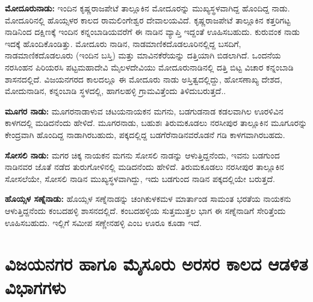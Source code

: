 \textbf{ಮೋದೂರುನಾಡು:} ಇಂದಿನ ಕೃಷ್ಣರಾಜಪೇಟೆ ತಾಲ್ಲೂಕಿನ ಮೋದೂರನ್ನು ಮುಖ್ಯಸ್ಥಳವಾಗಿದ್ದ ಹೊಂದಿದ್ದ ನಾಡು. ಮೋದೂರಿನಲ್ಲಿ ಹೊಯ್ಸಳರ ಕಾಲದ ರಾಮಲಿಂಗೇಶ್ವರ ದೇವಾಲಯವಿದೆ. ಕೃಷ್ಣರಾಜಪೇಟೆ ತಾಲ್ಲೂಕಿನ ಕತ್ತರಿಗಟ್ಟ ನಾಡಿನಿಂದ ದಕ್ಷಿಣಕ್ಕೆ ಇಂದಿನ ಕನ್ನಂಬಾಡಿಯವರೆಗೆ ಈ ನಾಡಿನ ವ್ಯಾಪ್ತಿ ಇದ್ದಂತೆ ಊಹಿಸಬಹುದು. ಕುರುವಂಕ ನಾಡು ಇದಕ್ಕೆ ಹೊಂದಿಕೊಂಡಿತ್ತು. ಮೋದೂರು ನಾಡಿನ, ನಾಡಮಾಣಿಕದೊಡಲೂರಿನಲ್ಲಿದ್ದ ಬಸದಿಗೆ, ನಾಡಮಾಣಿಕದೊಡಲೂರು (ಇಂದಿನ ಬಸ್ತಿ) ಮತ್ತು ಮಾವಿನಕೆರೆಯನ್ನು ದತ್ತಿಯಾಗಿ ಬಿಡಲಾಗಿದೆ. ಒಂದನೆಯ ನರಸಿಂಹನ ಪಿರಿಯರಸಿ ಪಟ್ಟಮಹಾದೇವಿ ಮೈಲಳದೇವಿಯು ಮೋದೂರುನಾಡಿನಲ್ಲಿ ದತ್ತಿ ಬಿಟ್ಟ ವಿಚಾರ ಕನ್ನಂಬಾಡಿ ಶಾಸನದಲ್ಲಿದೆ. ವಿಜಯನಗರದ ಕಾಲದಲ್ಲೂ ಈ ಮೋದೂರು ನಾಡು ಅಸ್ತಿತ್ವದಲ್ಲಿದ್ದು, ಹೋಸಣಾಖ್ಯ ದೇಶದ, ಮೋದುನಾಡಿನ, ಕನ್ನಂಬಾಡಿ ಸ್ಥಳದಲ್ಲಿ, ಹಾಗಲಹಳ್ಳಿ ಗ್ರಾಮವಿತ್ತೆಂದು ತಿಳಿದುಬರುತ್ತದೆ..

\textbf{ಮೂಗರ ನಾಡು:} ಮೂಗರನಾಡಾಳುವ ಚಟಯನಾಯಕನ ಮಗನು, ಬಡಗುಡನಾಡ ಕಡಲವಾಗಿಲ ಊರಳಿವಿನ ಕಾಳಗದಲ್ಲಿ ಮಡಿದನೆಂದು ಹೇಳಿದೆ. ಮೂಗರನಾಡು, ಬಹುಶಃ ತಿರುಮಕೂಡಲು ನರಸೀಪುರ ತಾಲ್ಲೂಕಿನ ಮೂಗೂರನ್ನು ಕೇಂದ್ರವಾಗಿ ಹೊಂದಿದ್ದ ನಾಡಾಗಿರಬಹುದು, ಪಕ್ಕದಲ್ಲಿದ್ದ ಬಡಗೆರೆನಾಡಿನವರೊಡನೆ ಗಡಿ ಕಾಳಗವಾಗಿರಬಹದು.

\textbf{ಸೋಸಲಿ ನಾಡು:} ಮಗರ ಚಿಕ್ಕ ನಾಯಕನ ಮಗನು ಸೋಸಲಿ ನಾಡನ್ನು ಆಳುತ್ತಿದ್ದನೆಂದು, ಇವನು ಬಡಗುಂದ ನಾಡಿನವರ ಜೊತೆ ನಡೆದ ತುರುಗೋಳಿನಲ್ಲಿ ಮಡಿದನೆಂದು ಹೇಳಿದೆ. ತಿರುಮಕೂಡಲು ನರಸೀಪುರ ತಾಲ್ಲೂಕಿನ ಸೋಸಲೆಯೇ, ಸೋಸಲಿ ನಾಡಿನ ಮುಖ್ಯಸ್ಥಳವಾಗಿದ್ದು, ಇದು ಬಡಗುಂದ ನಾಡಿನ ಪಕ್ಕದಲ್ಲಿಯೇ ಬರುತ್ತದೆ.

\textbf{ಹೊಯ್ಸಳ ಸಣ್ನೆನಾಡು:} ಹೊಯ್ಸಳ ಸಣ್ನೆನಾಡನ್ನು ಚಂಗಿಕುಳಕಮಳ ಮಾರ್ತಾಂಡ ಸಾಮಂತ ಭರತೆಯ ನಾಯಕನು ಆಳುತ್ತಿದ್ದನೆಂದು ಕಂಬದಹಳ್ಳಿ ಶಾಸನದಲ್ಲಿದೆ. ಕಂಬದಹಳ್ಳಿಯ ಸುತ್ತಮುತ್ತಲ ಭಾಗ ಈ ಸಣ್ನೆನಾಡಿಗೆ ಸೇರಿತ್ತೆಂದು ಊಹಿಸಬಹುದು. ಇಲ್ಲಿಗೆ ಸಮೀಪ ಸಣ್ಣೇನಹಳ್ಳಿ ಎಂಬ ಊರೂ ಕೂಡಾ ಇದೆ.


\section*{ವಿಜಯನಗರ ಹಾಗೂ ಮೈಸೂರು ಅರಸರ ಕಾಲದ ಆಡಳಿತ ವಿಭಾಗಗಳು}

\vskip -4pt

